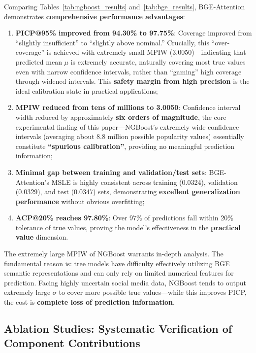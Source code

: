 \documentclass[10pt]{article}
\begin{document}
Comparing Tables~\ref{tab:ngboost_results} and~\ref{tab:bge_results}, BGE-Attention demonstrates \textbf{comprehensive performance advantages}:

\begin{enumerate}[leftmargin=*]
    \item \textbf{PICP@95\% improved from 94.30\% to 97.75\%}: Coverage improved from ``slightly insufficient'' to ``slightly above nominal.'' Crucially, this ``over-coverage'' is achieved with extremely small MPIW (3.0050)---indicating that predicted mean $\mu$ is extremely accurate, naturally covering most true values even with narrow confidence intervals, rather than ``gaming'' high coverage through widened intervals. This \textbf{safety margin from high precision} is the ideal calibration state in practical applications;
    \item \textbf{MPIW reduced from tens of millions to 3.0050}: Confidence interval width reduced by approximately \textbf{six orders of magnitude}, the core experimental finding of this paper---NGBoost's extremely wide confidence intervals (averaging about 8.8 million possible popularity values) essentially constitute \textbf{``spurious calibration''}, providing no meaningful prediction information;
    \item \textbf{Minimal gap between training and validation/test sets}: BGE-Attention's MSLE is highly consistent across training (0.0324), validation (0.0329), and test (0.0347) sets, demonstrating \textbf{excellent generalization performance} without obvious overfitting;
    \item \textbf{ACP@20\% reaches 97.80\%}: Over 97\% of predictions fall within 20\% tolerance of true values, proving the model's effectiveness in the \textbf{practical value} dimension.
\end{enumerate}

The extremely large MPIW of NGBoost warrants in-depth analysis. The fundamental reason is: tree models have difficulty effectively utilizing BGE semantic representations and can only rely on limited numerical features for prediction. Facing highly uncertain social media data, NGBoost tends to output extremely large $\sigma$ to cover more possible true values---while this improves PICP, the cost is \textbf{complete loss of prediction information}.

\subsection{Ablation Studies: Systematic Verification of Component Contributions}
\end{document}

